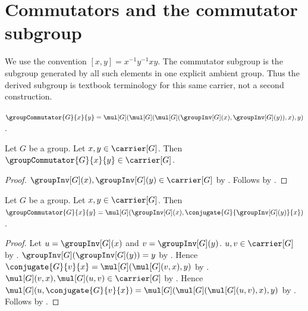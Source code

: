 



\section{Commutators and the commutator subgroup}

We use the convention
\( [x,y]=x^{-1}y^{-1}xy \).  The commutator subgroup is the subgroup
generated by all such elements in one explicit ambient group.  Thus the
derived subgroup is textbook terminology for this same carrier, not a second
construction.

\begin{definition}\label{group_commutator}
    $\groupCommutator{G}{x}{y}=
        \mul[G](
            \mul[G](
                \mul[G](\groupInv[G](x),\groupInv[G](y)),x),y)$.
\end{definition}

\begin{proposition}\label{group_commutator_type}
    Let $G$ be a group.
    Let $x,y\in\carrier[G]$.
    Then $\groupCommutator{G}{x}{y}\in\carrier[G]$.
\end{proposition}
\begin{proof}
    $\groupInv[G](x),\groupInv[G](y)\in\carrier[G]$ by
        .
    Follows by
        .
\end{proof}

\begin{proposition}\label{group_commutator_eq_inverse_mul_conjugate}
    Let $G$ be a group.
    Let $x,y\in\carrier[G]$.
    Then
        $\groupCommutator{G}{x}{y}=
            \mul[G](\groupInv[G](x),
                \conjugate{G}{\groupInv[G](y)}{x})$.
\end{proposition}
\begin{proof}
    Let $u=\groupInv[G](x)$ and $v=\groupInv[G](y)$.
    $u,v\in\carrier[G]$ by .
    $\groupInv[G](\groupInv[G](y))=y$ by
        .
    Hence
        $\conjugate{G}{v}{x}=\mul[G](\mul[G](v,x),y)$ by
        .
    $\mul[G](v,x),\mul[G](u,v)\in\carrier[G]$ by
        .
    Hence
        $\mul[G](u,\conjugate{G}{v}{x})=
            \mul[G](\mul[G](\mul[G](u,v),x),y)$ by
        .
    Follows by .
\end{proof}

